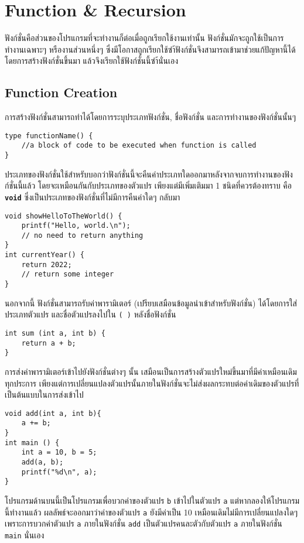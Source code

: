 \chapter{Function \& Recursion}
ฟังก์ชั่นคือส่วนของโปรแกรมที่จะทำงานก็ต่อเมื่อถูกเรียกใช้งานเท่านั้น ฟังก์ชั่นมักจะถูกใช้เป็นการทำงานเฉพาะๆ หรืองานส่วนหนึ่งๆ ซึ่งมีโอกาสถูกเรียกใช้ซำ้ฟังก์ชั่นจึงสามารถเข้ามาช่วยแก้ปัญหานี้ได้ โดยการสร้างฟังก์ชั่นขึ้นมา แล้วจึงเรียกใช้ฟังก์ชั่นนี้ซำ้นั่นเอง

\section{Function Creation}
การสร้างฟังก์ชั่นสามารถทำได้โดยการระบุประเภทฟังก์ชั่น, ชื่อฟังก์ชั่น และการทำงานของฟังก์ชั่นนั้นๆ
\begin{lstlisting}
type functionName() {
	//a block of code to be executed when function is called
}
\end{lstlisting}
ประเภทของฟังก์ชั่นใช้สำหรับบอกว่าฟังก์ชั่นนี้จะคืนค่าประเภทใดออกมาหลังจากจบการทำงานของฟังก์ชั่นนี้แล้ว โดยจะเหมือนกันกับประเภทของตัวแปร เพียงแต่มีเพิ่มเติมมา 1 ชนิดที่ควรต้องทราบ คือ \textbf{\texttt{void}} ซึ่งเป็นประเภทของฟังก์ชั่นที่ไม่มีการคืนค่าใดๆ กลับมา
\begin{lstlisting}
void showHelloToTheWorld() {
	printf("Hello, world.\n");
    // no need to return anything
}
int currentYear() {
	return 2022;
    // return some integer
}
\end{lstlisting}

นอกจากนี้ ฟังก์ชั่นสามารถรับค่าพารามิเตอร์ (เปรียบเสมือนข้อมูลนำเข้าสำหรับฟังก์ชั่น) ได้โดยการใส่ประเภทตัวแปร และชื่อตัวแปรลงไปใน \texttt{( )} หลังชื่อฟังก์ชั่น
\begin{lstlisting}
int sum (int a, int b) {
	return a + b;
}
\end{lstlisting}

การส่งค่าพารามิเตอร์เข้าไปยังฟังก์ชั่นต่างๆ นั้น เสมือนเป็นการสร้างตัวแปรใหม่ขึ้นมาที่มีค่าเหมือนเดิมทุกประการ เพียงแต่การเปลี่ยนแปลงตัวแปรนั้นภายในฟังก์ชั่นจะไม่ส่งผลกระทบต่อค่าเดิมของตัวแปรที่เป็นต้นแบบในการส่งเข้าไป
\begin{lstlisting}
void add(int a, int b){
	a += b;
}
int main () {
	int a = 10, b = 5;
    add(a, b);
    printf("%d\n", a);
}
\end{lstlisting}
โปรแกรมด้านบนนี้เป็นโปรแกรมเพื่อบวกค่าของตัวแปร \texttt{b} เข้าไปในตัวแปร \texttt{a} แต่หากลองให้โปรแกรมนี้ทำงานแล้ว ผลลัพธ์จะออกมาว่าค่าของตัวแปร \texttt{a} ยังมีค่าเป็น 10 เหมือนเดิมไม่มีการเปลี่ยนแปลงใดๆ เพราะการบวกค่าตัวแปร \texttt{a} ภายในฟังก์ชั่น \texttt{add} เป็นตัวแปรคนละตัวกับตัวแปร \texttt{a} ภายในฟังก์ชั่น \texttt{main} นั่นเอง

